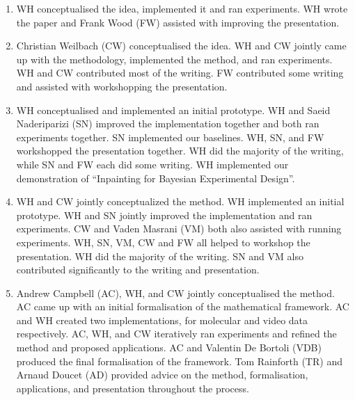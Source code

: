 \begin{enumerate}
    \item WH conceptualised the idea, implemented it and ran experiments. WH wrote the paper and Frank Wood (FW) assisted with improving the presentation.
    \item Christian Weilbach (CW) conceptualised the idea. WH and CW jointly came up with the methodology, implemented the method, and ran experiments. WH and CW contributed most of the writing. FW contributed some writing and assisted with workshopping the presentation.  
    \item WH conceptualised and implemented an initial prototype. WH and Saeid Naderiparizi (SN) improved the implementation together and both ran experiments together.  SN implemented our baselines. WH, SN, and FW workshopped the presentation together. WH did the majority of the writing, while SN and FW each did some writing. WH implemented our demonstration of ``Inpainting for Bayesian Experimental Design''.
    \item WH and CW jointly conceptualized the method. WH implemented an initial prototype. WH and SN jointly improved the implementation and ran experiments. CW and Vaden Masrani (VM) both also assisted with running experiments. WH, SN, VM, CW and FW all helped to workshop the presentation. WH did the majority of the writing. SN and VM also contributed significantly to the writing and presentation.
    \item Andrew Campbell (AC), WH, and CW jointly conceptualised the method. AC came up with an initial formalisation of the mathematical framework. AC and WH created two implementations, for molecular and video data respectively. AC, WH, and CW iteratively ran experiments and refined the method and proposed applications. AC and Valentin De Bortoli (VDB) produced the final formalisation of the framework. Tom Rainforth (TR) and Arnaud Doucet (AD) provided advice on the method, formalisation, applications, and presentation throughout the process.
\end{enumerate}